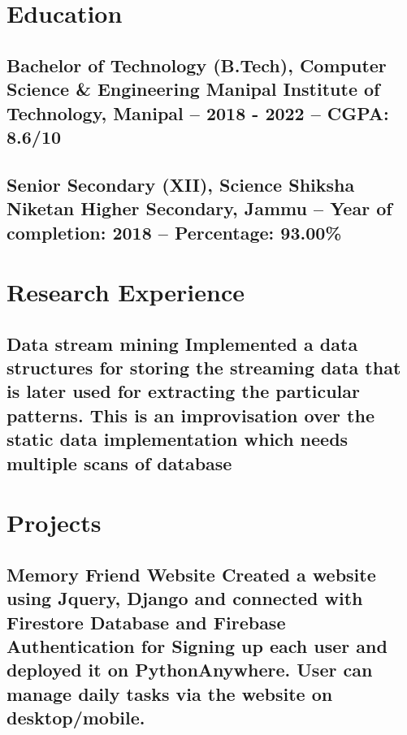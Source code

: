 \documentclass{article}
\begin{document}
\section{Education}

\subsection{\textbf{Bachelor of Technology (B.Tech), Computer Science \& Engineering}\newline
    \textmd{Manipal Institute of Technology, Manipal --  2018 - 2022 -- CGPA: 8.6/10}}

\subsection{\textbf{Senior Secondary (XII), Science}\newline
    \textmd{ Shiksha Niketan Higher Secondary, Jammu -- Year of completion: 2018 --  Percentage: 93.00\%}}


\section{Research Experience}

\subsection{\textbf{Data stream mining}
    \textmd{Implemented a data structures for storing the streaming data that is later used for extracting the particular patterns. This is an improvisation over the static data implementation which needs multiple scans of database }}

\section{Projects}

\subsection{\textbf{Memory Friend Website}
    \textmd{Created a website using Jquery, Django and connected with Firestore Database and Firebase Authentication for Signing up each user and deployed it on PythonAnywhere. User can manage daily tasks via the website on desktop/mobile.}}
    
\end{document}
